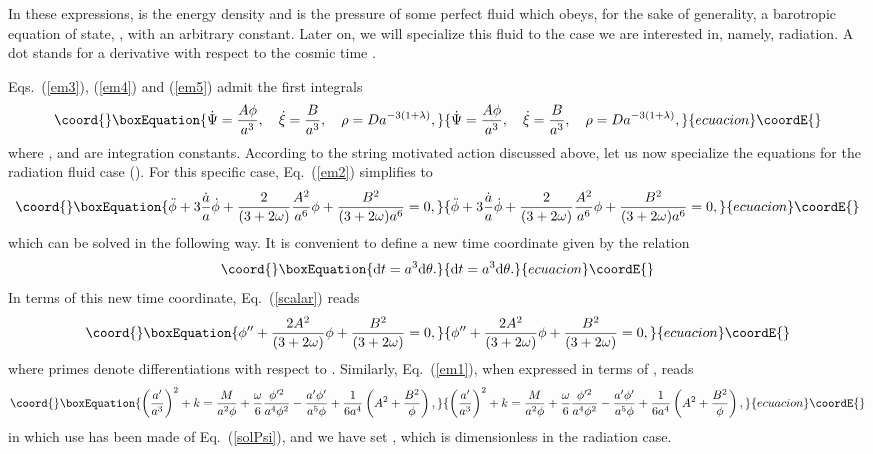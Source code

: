 \documentclass[a4paper,aps,twocolumn,prd,showpacs,nofootinbib]{revtex4}
\providecommand{\dd}{\mathrm{d}}
\begin{document}
In these expressions, \myHighlight{$\rho$}\coordHE{} is the energy density and \coordHE{} is the
pressure of some perfect fluid which obeys, for the sake of
generality, a barotropic equation of state, \coordHE{}, with
\myHighlight{$\lambda$}\coordHE{} an arbitrary constant. Later on, we will specialize this
fluid to the case we are interested in, namely, radiation.  A dot
stands for a derivative with respect to the cosmic time \coordHE{}.

Eqs.~(\ref{em3}), (\ref{em4}) and (\ref{em5}) admit the first
integrals
\begin{equation}\coord{}\boxEquation{
\dot\Psi = \frac{A\phi}{a^3}, \quad \dot\xi = \frac{B}{a^3}, \quad
\rho = D a^{- 3(1 + \lambda)}, \label{solPsi}
}{
\dot\Psi = \frac{A\phi}{a^3}, \quad \dot\xi = \frac{B}{a^3}, \quad
\rho = D a^{- 3(1 + \lambda)}, }{ecuacion}\coordE{}\end{equation}
where \coordHE{}, \coordHE{} and \coordHE{} are integration constants. According to the
string motivated action discussed above, let us now specialize the
equations for the radiation fluid case (\coordHE{}).  For this
specific case, Eq.~(\ref{em2}) simplifies to
\begin{equation}\coord{}\boxEquation{
\label{scalar} \ddot\phi + 3\frac{\dot a}{a}\dot\phi + \frac{2}{(3
+ 2\omega)}\frac{A^2}{a^6}\phi + \frac{B^2}{(3 + 2 \omega)a^6} = 0,
}{
\ddot\phi + 3\frac{\dot a}{a}\dot\phi + \frac{2}{(3
+ 2\omega)}\frac{A^2}{a^6}\phi + \frac{B^2}{(3 + 2 \omega)a^6} = 0,
}{ecuacion}\coordE{}\end{equation}
which can be solved in the following way. It is convenient to define a
new time coordinate \myHighlight{$\theta$}\coordHE{} given by the relation 
\begin{equation}\coord{}\boxEquation{
\dd t = a^3 \dd\theta.
\label{parameter}
}{
\dd t = a^3 \dd\theta.
}{ecuacion}\coordE{}\end{equation}
In terms of this new time coordinate, Eq.~(\ref{scalar}) reads
\begin{equation}\coord{}\boxEquation{
\label{scalar'} \phi'' + \frac{2A^2}{(3 + 2\omega)}\phi +
\frac{B^2}{(3 + 2 \omega)} = 0,
}{
\phi'' + \frac{2A^2}{(3 + 2\omega)}\phi +
\frac{B^2}{(3 + 2 \omega)} = 0,
}{ecuacion}\coordE{}\end{equation}
where primes denote differentiations with respect to \myHighlight{$\theta$}\coordHE{}.
Similarly, Eq.~(\ref{em1}), when expressed in terms of \myHighlight{$\theta$}\coordHE{}, reads
\begin{equation}\coord{}\boxEquation{ \left({a'\over a^3}\right)^2 +k={M\over a^2 \phi} +
{\omega \over 6} {\phi'^2 \over a^4 \phi^2} - {a'\phi'\over a^5 \phi}
+{1\over 6 a^4} \left( A^2 + {B^2\over
\phi}\right),\label{aprim}}{ \left({a'\over a^3}\right)^2 +k={M\over a^2 \phi} +
{\omega \over 6} {\phi'^2 \over a^4 \phi^2} - {a'\phi'\over a^5 \phi}
+{1\over 6 a^4} \left( A^2 + {B^2\over
\phi}\right),}{ecuacion}\coordE{}\end{equation} in which use has been made of
Eq.~(\ref{solPsi}), 
and we have set \coordHE{}, which is dimensionless in the
radiation case.
\end{document}
